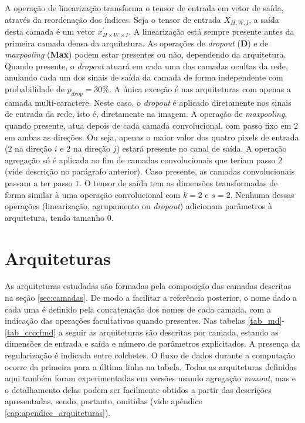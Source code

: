 A operação de linearização transforma o tensor de entrada em vetor de saída, através da reordenação dos índices. Seja o tensor de entrada $X_{H, W, I}$, a saída desta camada é um vetor $x^{'}_{H \times W \times I}$. A linearização está sempre presente antes da primeira camada densa da arquitetura. As operações de \textit{dropout} (\textbf{D}) e de \textit{maxpooling} (\textbf{Max}) podem estar presentes ou não, dependendo da arquitetura. Quando presente, o \textit{dropout} atuará em cada uma das camadas ocultas da rede, anulando cada um dos sinais de saída da camada de forma independente com probabilidade de $p_{drop} = 30\%$. A única exceção é nas arquiteturas com apenas a camada multi-caractere. Neste caso, o \textit{dropout} é aplicado diretamente nos sinais de entrada da rede, isto é, diretamente na imagem. A operação de \textit{maxpooling}, quando presente, atua depois de cada camada convolucional, com passo fixo em $2$ em ambas as direções. Ou seja, apenas o maior valor dos quatro pixels de entrada ($2$ na direção $i$ e $2$ na direção $j$) estará presente no canal de saída. A operação agregação só é aplicada ao fim de camadas convolucionais que teriam passo $2$ (vide descrição no parágrafo anterior). Caso presente, as camadas convolucionais passam a ter passo $1$. O tensor de saída tem as dimensões transformadas de forma similar à uma operação convolucional com $k = 2$ e $s = 2$. Nenhuma dessas operações (linearização, agrupamento ou \textit{dropout}) adicionam parâmetros à arquitetura, tendo tamanho $0$.

\section{Arquiteturas}

As arquiteturas estudadas são formadas pela composição das camadas descritas na seção \ref{sec:camadas}. De modo a facilitar a referência posterior, o nome dado a cada uma é definido pela concatenação dos nomes de cada camada, com a indicação das operações facultativas quando presentes. Nas tabelas \ref{tab_md}-\ref{tab_ccccfmd} a seguir as arquiteturas são descritas por camada, estando as dimensões de entrada e saída e número de parâmetros explicitados. A presença da regularização é indicada entre colchetes. O fluxo de dados durante a computação ocorre da primeira para a última linha na tabela. Todas as arquiteturas definidas aqui também foram experimentadas em versões usando agregação \textit{maxout}, mas e o detalhamento delas podem ser facilmente obtidos a partir das descrições apresentadas, sendo, portanto, omitidas (vide apêndice \ref{cap:apendice_arquiteturas}). 



